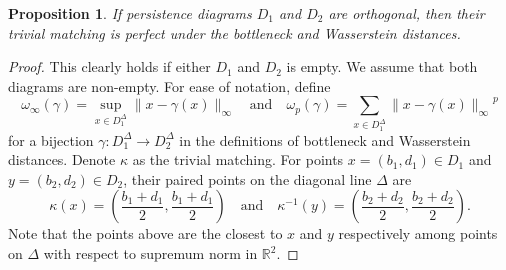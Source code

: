 \documentclass[sn-mathphys-num]{sn-jnl}%
\theoremstyle{thmstyleone}%
\newtheorem{proposition}[theorem]{Proposition}%
\theoremstyle{thmstyletwo}%
\theoremstyle{thmstylethree}%
\begin{document}
\begin{proposition}\label{proposition: orthogonality trivial perfect}
	If persistence diagrams $D_1$ and $D_2$ are orthogonal, then their trivial matching is perfect under the bottleneck and Wasserstein distances.
\end{proposition}
\begin{proof}
	This clearly holds if either $D_1$ and $D_2$ is empty. We assume that both diagrams are non-empty. For ease of notation, define
	\begin{equation*}
		\omega_{\infty}(\gamma)=\sup _{x \in D_1^{\Delta}}\|x-\gamma(x)\|_{\infty} \quad \textrm{and} \quad \omega_p(\gamma)=\sum_{x \in D_1^{\Delta}}{\|x-\gamma(x)\|_\infty}^p
	\end{equation*}
	for a bijection $\gamma: D_1^{\Delta} \rightarrow D_2^{\Delta}$ in the definitions of bottleneck and Wasserstein distances. Denote $\kappa$ as the trivial matching. For points $x=(b_1, d_1) \in D_1$ and $y=(b_2, d_2) \in D_2$, their paired points on the diagonal line $\Delta$ are
	\begin{equation*}
		\kappa(x)=\left(\frac{b_1+d_1}{2}, \frac{b_1+d_1}{2}\right) \quad \textrm{and} \quad \kappa^{-1}(y)=\left(\frac{b_2+d_2}{2}, \frac{b_2+d_2}{2}\right).
	\end{equation*}
	Note that the points above are the closest to $x$ and $y$ respectively among points on $\Delta$ with respect to supremum norm in $\mathbb{R}^2$.
	

\end{proof}
\end{document}
